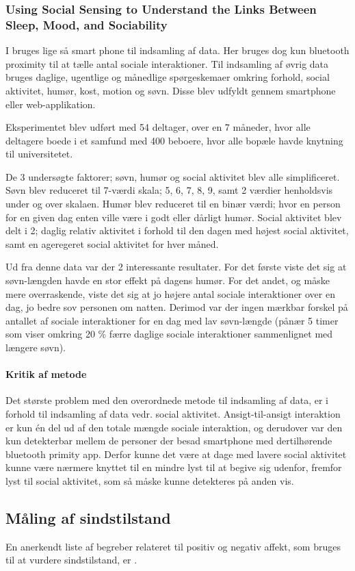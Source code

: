 \subsubsection{Using Social Sensing to Understand the Links Between Sleep, Mood, and Sociability}
I \citet{social_sensing_2} bruges lige så smart phone til indsamling af data.
Her bruges dog kun bluetooth proximity til at tælle antal sociale interaktioner.
Til indsamling af øvrig data bruges daglige, ugentlige og månedlige spørgeskemaer omkring forhold, social aktivitet, humør, kost, motion og søvn.
Disse blev udfyldt gennem smartphone eller web-applikation.

Eksperimentet blev udført med 54 deltager, over en 7 måneder, hvor alle deltagere boede i et samfund med 400 beboere, hvor alle bopæle havde knytning til universitetet.

De 3 undersøgte faktorer; søvn, humør og social aktivitet blev alle simplificeret.
Søvn blev reduceret til 7-værdi skala; 5, 6, 7, 8, 9, samt 2 værdier henholdsvis under og over skalaen.
Humør blev reduceret til en binær værdi; hvor en person for en given dag enten ville være i godt eller dårligt humør.
Social aktivitet blev delt i 2; daglig relativ aktivitet i forhold til den dagen med højest social aktivitet, samt en ageregeret social aktivitet for hver måned.

Ud fra denne data var der 2 interessante resultater.
For det første viste det sig at søvn-længden havde en stor effekt på dagens humør.
For det andet, og måske mere overraskende, viste det sig at jo højere antal sociale interaktioner over en dag, jo bedre sov personen om natten.
Derimod var der ingen mærkbar forskel på antallet af sociale interaktioner for en dag med lav søvn-længde (pånær 5 timer som viser omkring 20 \% færre daglige sociale interaktioner sammenlignet med længere søvn).

\paragraph{Kritik af metode}
Det største problem med den overordnede metode til indsamling af data, er i forhold til indsamling af data vedr. social aktivitet.
Ansigt-til-ansigt interaktion er kun én del ud af den totale mængde sociale interaktion, og derudover var den kun detekterbar mellem de personer der besad smartphone med dertilhørende bluetooth primity app.
Derfor kunne det være at dage med lavere social aktivitet kunne være nærmere knyttet til en mindre lyst til at begive sig udenfor, fremfor lyst til social aktivitet, som så måske kunne detekteres på anden vis.

\subsection{Måling af sindstilstand}
En anerkendt liste af begreber relateret til positiv og negativ affekt, som bruges til at vurdere sindstilstand, er \citet{panas}.

